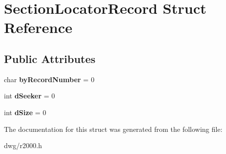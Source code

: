 \hypertarget{struct_section_locator_record}{}\section{Section\+Locator\+Record Struct Reference}
\label{struct_section_locator_record}
\subsection*{Public Attributes}
\begin{DoxyCompactItemize}
\item 
char {\bfseries by\+Record\+Number} = 0\hypertarget{struct_section_locator_record_a6f28d6c0e4f388b15a5d546ad54f18e5}{}\label{struct_section_locator_record_a6f28d6c0e4f388b15a5d546ad54f18e5}

\item 
int {\bfseries d\+Seeker} = 0\hypertarget{struct_section_locator_record_a659be660df6a7da3ee8fa998068c0e66}{}\label{struct_section_locator_record_a659be660df6a7da3ee8fa998068c0e66}

\item 
int {\bfseries d\+Size} = 0\hypertarget{struct_section_locator_record_ab9d1fa4b173da7115a588ca643d7831c}{}\label{struct_section_locator_record_ab9d1fa4b173da7115a588ca643d7831c}

\end{DoxyCompactItemize}


The documentation for this struct was generated from the following file\+:\begin{DoxyCompactItemize}
\item 
dwg/r2000.\+h\end{DoxyCompactItemize}
